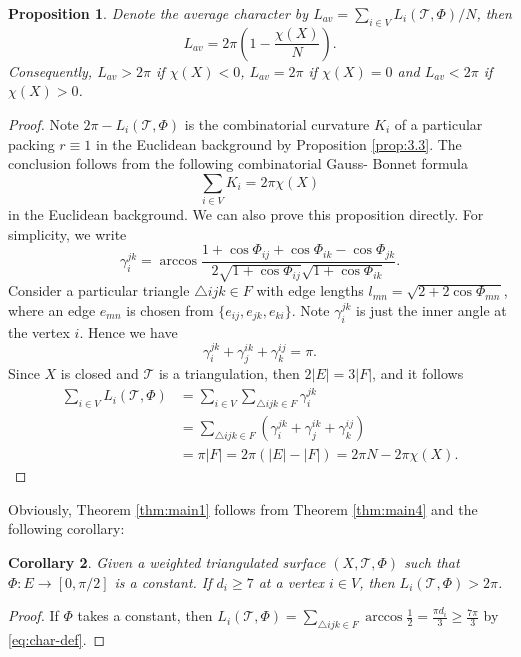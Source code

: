 \documentclass[12pt]{amsart}
\numberwithin{equation}{section}
\newtheorem{prop}{Proposition}[section]
\newtheorem{cor}[prop]{Corollary}
\begin{document}
\begin{prop}\label{prop:3.4}
Denote the average character by $L_{av} = \sum_{i \in V} L_i(\mathcal{T},\Phi) / N$, then
\[
L_{av} = 2\pi\left(1 - \frac{\chi(X)}{N}\right).
\]
Consequently, $L_{av} > 2\pi$ if $\chi(X) < 0$, $L_{av} = 2\pi$ if $\chi(X) = 0$ and $L_{av} < 2\pi$ if $\chi(X) > 0$.
\end{prop}

\begin{proof}
Note $2\pi - L_i(\mathcal{T},\Phi)$ is the combinatorial curvature $K_i$ of a particular packing $r \equiv 1$ in the
Euclidean background by Proposition \ref{prop:3.3}. The conclusion follows from the following combinatorial Gauss-
Bonnet formula \cite{ChowLuo}
\[
\sum_{i \in V} K_i = 2\pi\chi(X)
\]
in the Euclidean background. We can also prove this proposition directly. For simplicity, we write
\[
\gamma_i^{jk} = \arccos \frac{1 + \cos\Phi_{ij} + \cos\Phi_{ik} - \cos\Phi_{jk}}{2\sqrt{1 + \cos\Phi_{ij}}\sqrt{1 + \cos\Phi_{ik}}}.
\]
Consider a particular triangle $\triangle ijk \in F$ with edge lengths $l_{mn} = \sqrt{2 + 2\cos\Phi_{mn}}$, where an edge $e_{mn}$ is
chosen from $\{e_{ij}, e_{jk}, e_{ki}\}$. Note $\gamma_i^{jk}$ is just the inner angle at the vertex $i$. Hence we have
\[
\gamma_i^{jk} + \gamma_j^{ik} + \gamma_k^{ij} = \pi.
\]
Since $X$ is closed and $\mathcal{T}$ is a triangulation, then $2|E| = 3|F|$, and it follows
\begin{align*}
\sum_{i \in V} L_i(\mathcal{T},\Phi) &= \sum_{i \in V} \sum_{\triangle ijk \in F} \gamma_i^{jk} \\
&= \sum_{\triangle ijk \in F} (\gamma_i^{jk} + \gamma_j^{ik} + \gamma_k^{ij}) \\
&= \pi |F| = 2\pi(|E| - |F|) = 2\pi N - 2\pi\chi(X).
\end{align*}
\end{proof}

Obviously, Theorem \ref{thm:main1} follows from Theorem \ref{thm:main4} and the following corollary:

\begin{cor}\label{cor:3.5}
Given a weighted triangulated surface $(X,\mathcal{T},\Phi)$ such that $\Phi : E \to [0,\pi/2]$ is a
constant. If $d_i \geq 7$ at a vertex $i \in V$, then $L_i(\mathcal{T},\Phi) > 2\pi$.
\end{cor}

\begin{proof}
If $\Phi$ takes a constant, then $L_i(\mathcal{T},\Phi) = \sum_{\triangle ijk \in F} \arccos \frac{1}{2} = \frac{\pi d_i}{3} \geq \frac{7\pi}{3}$ by \eqref{eq:char-def}.
\end{proof}
\end{document}
